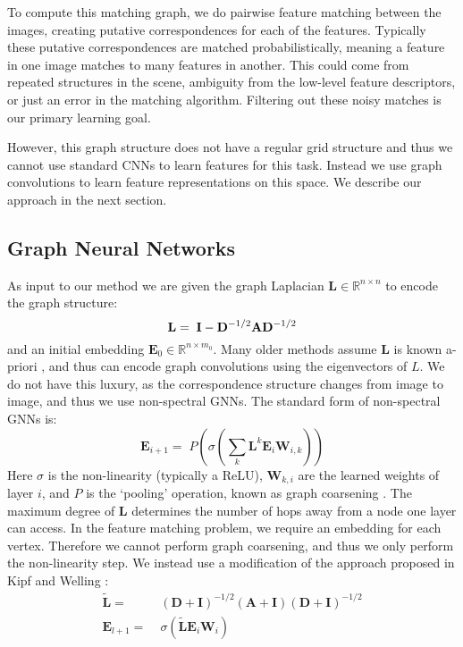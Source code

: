 \documentclass[10pt,twocolumn,letterpaper]{article}
\newcommand{\bR}{\mathbb{R}}
\newcommand{\mat}[1]{\mathbf{#1}}
\begin{document}
To compute this matching graph, we do pairwise feature matching between the images, creating putative correspondences for each of the features.
Typically these putative correspondences are matched probabilistically, meaning a feature in one image matches to many features in another.
This could come from repeated structures in the scene, ambiguity from the low-level feature descriptors, or just an error in the matching algorithm.
Filtering out these noisy matches is our primary learning goal.

However, this graph structure does not have a regular grid structure and thus we cannot use standard CNNs to learn features for this task.
Instead we use graph convolutions to learn feature representations on this space.
We describe our approach in the next section.

\subsection{Graph Neural Networks}
As input to our method we are given the graph Laplacian $\mat{L} \in \bR^{n \times n}$ to encode the graph structure:
\begin{equation}
  \mat{L} =\; \mat{I} - \mat{D}^{-1/2} \mat{A} \mat{D}^{-1/2} \\
\end{equation}
and an initial embedding $\mat{E}_0 \in \bR^{n \times m_0}$.
Many older methods assume $\mat{L}$ is known a-priori \cite{bruna2013spectral}, and thus can encode graph convolutions using the eigenvectors of $L$.
We do not have this luxury, as the correspondence structure changes from image to image, and thus we use non-spectral GNNs. The standard form of non-spectral GNNs is:
\begin{equation}
\mat{E}_{i+1} =\; P\left(\sigma\left( \sum_k \mat{L}^k \mat{E}_i \mat{W}_{i,k} \right)\right)
\end{equation}
Here $\sigma$ is the non-linearity (typically a ReLU), $\mat{W}_{k,i}$ are the learned weights of layer $i$,  and $P$ is the `pooling' operation, known as graph coarsening \cite{bronstein2017geometric, gama2018mimo}.
The maximum degree of $\mat{L}$ determines the number of hops away from a node one layer can access.
In the feature matching problem, we require an embedding for each vertex.
Therefore we cannot perform graph coarsening, and thus we only perform the non-linearity step.
We instead use a modification of the approach proposed in Kipf and Welling \cite{kipf2016semi}:
\begin{align}
      \widetilde{\mat{L}} =&\; (\mat{D} + \mat{I})^{-1/2} (\mat{A} + \mat{I}) (\mat{D} + \mat{I})^{-1/2} \\
\mat{E}_{l+1} =&\; \sigma\left(\widetilde{\mat{L}} \mat{E}_i \mat{W}_i \right)  \label{eq:graph_conv}
\end{align}
\end{document}
